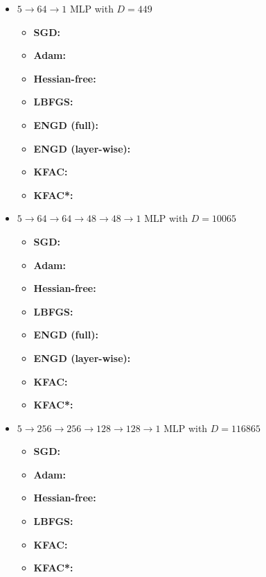 \begin{itemize}
\item $5\to 64\to 1$ MLP with $D=449$
  \begin{itemize}
    \def\pathToRuns{kfac_pinns_exp/exp27_heat4d_small/tex}
  \item \textbf{SGD:} 
  \item \textbf{Adam:} 
  \item \textbf{Hessian-free:} 
  \item \textbf{LBFGS:} 
  \item \textbf{ENGD (full):} 
  \item \textbf{ENGD (layer-wise):} 
  \item \textbf{KFAC:} 
  \item \textbf{KFAC*:} 
  \end{itemize}

\item $5 \to 64 \to 64 \to 48 \to 48 \to 1$ MLP with $D=\num{10065}$
  \begin{itemize}
    \def\pathToRuns{kfac_pinns_exp/exp28_heat4d_medium/tex}
  \item \textbf{SGD:} 
  \item \textbf{Adam:} 
  \item \textbf{Hessian-free:} 
  \item \textbf{LBFGS:} 
  \item \textbf{ENGD (full):} 
  \item \textbf{ENGD (layer-wise):} 
  \item \textbf{KFAC:} 
  \item \textbf{KFAC*:} 
  \end{itemize}

\item $5 \to 256 \to 256\to 128 \to 128 \to 1$ MLP with $D=\num{116865}$
  \begin{itemize}
    \def\pathToRuns{kfac_pinns_exp/exp29_heat4d_big/tex}
  \item \textbf{SGD:} 
  \item \textbf{Adam:} 
  \item \textbf{Hessian-free:} 
  \item \textbf{LBFGS:} 
  \item \textbf{KFAC:} 
  \item \textbf{KFAC*:} 
  \end{itemize}
\end{itemize}

